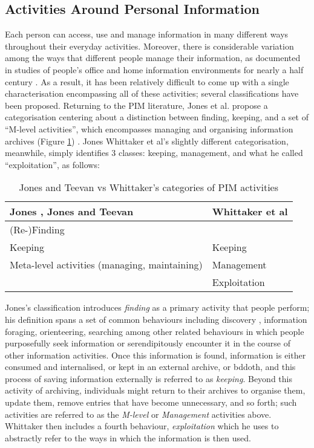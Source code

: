 \documentclass[runningheads,a4paper]{llncs}
\begin{document}
\subsection{Activities Around Personal Information}

Each person can access, use and manage information in many different ways throughout their everyday activities.  Moreover, there is considerable variation among the ways that different people manage their information, as documented in studies of people's office and home information environments for nearly a half century \cite{filerspilers}.  As a result, it has been relatively difficult to come up with a single characterisation encompassing all of these activities; several classifications have been proposed.  Returning to the PIM literature, Jones et al. propose a categorisation centering about a distinction between finding, keeping, and a set of ``M-level activities'', which encompasses managing and organising information archives (Figure \ref{fig:pimactivities}) \cite{kftf}. Jones Whittaker et al's slightly different categorisation, meanwhile, simply identifies 3 classes: keeping, management, and what he called ``exploitation'', as follows:

\begin{table}
\begin{center}
\begin{tabular}{p{4.5cm} | p{4.5cm}} 
Jones \cite{jones}, Jones and Teevan \cite{jonesteevan}& Whittaker et al \cite{whittaker}\\
\hline
(Re-)Finding &  \\
Keeping & Keeping \\
Meta-level activities (managing, maintaining) & Management \\
 & Exploitation \\
\end{tabular}
\caption{Jones and Teevan vs Whittaker's categories of PIM activities}
\label{fig:pimactivities}
\end{center}
\end{table}

Jones's classification introduces \emph{finding} as a primary activity that people perform; his definition spans a set of common behaviours including discovery \cite{}, information foraging\cite{}, orienteering\cite{}, searching\cite{} among other related behaviours in which people purposefully seek information or serendipitously encounter it in the course of other information activities.  Once this information is found, information is either consumed and internalised, or kept in an external archive, or bddoth, and this process of saving information externally is referred to as \emph{keeping}.  Beyond this activity of archiving, individuals might return to their archives to organise them, update them, remove entries that have become unnecessary, and so forth; such activities are referred to as the \emph{M-level} or \emph{Management} activities above.   Whittaker then includes a fourth behaviour, \emph{exploitation} which he uses to abstractly refer to the ways in which the information is then used.
\end{document}
